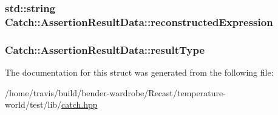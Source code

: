 \hypertarget{struct_catch_1_1_assertion_result_data_a9e809d36fffbeb1c7d0cbe7382dd9595}{
\subsubsection[{reconstructed\-Expression}]{\setlength{\rightskip}{0pt plus 5cm}std\-::string Catch\-::\-Assertion\-Result\-Data\-::reconstructed\-Expression\hspace{0.3cm}{\ttfamily [mutable]}}}\label{struct_catch_1_1_assertion_result_data_a9e809d36fffbeb1c7d0cbe7382dd9595}
\hypertarget{struct_catch_1_1_assertion_result_data_a7ceab4a7ff722aec5587e3748caf66b7}{
\subsubsection[{result\-Type}]{ Catch\-::\-Assertion\-Result\-Data\-::result\-Type}}\label{struct_catch_1_1_assertion_result_data_a7ceab4a7ff722aec5587e3748caf66b7}


The documentation for this struct was generated from the following file\-:\begin{DoxyCompactItemize}
\item 
/home/travis/build/bender-\/wardrobe/\-Recast/temperature-\/world/test/lib/\hyperlink{catch_8hpp}{catch.\-hpp}\end{DoxyCompactItemize}
